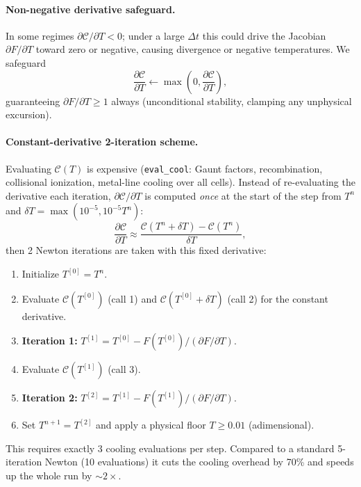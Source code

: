 \documentclass[english,a4paper]{my_memo}
\begin{document}
\paragraph{Non-negative derivative safeguard.} In some regimes
$\partial \mathcal{C}/\partial T < 0$; under a large $\Delta t$ this could drive the
Jacobian $\partial F/\partial T$ toward zero or negative, causing divergence or
negative temperatures. We safeguard
\begin{equation}
  \frac{\partial \mathcal{C}}{\partial T} \leftarrow \max\!\left(0, \frac{\partial \mathcal{C}}{\partial T}\right),
\end{equation}
guaranteeing $\partial F/\partial T \ge 1$ always (unconditional stability,
clamping any unphysical excursion).

\paragraph{Constant-derivative 2-iteration scheme.} Evaluating $\mathcal{C}(T)$ is
expensive (\texttt{eval\_cool}: Gaunt factors, recombination, collisional
ionization, metal-line cooling over all cells). Instead of re-evaluating the
derivative each iteration, $\partial \mathcal{C}/\partial T$ is computed \emph{once}
at the start of the step from $T^n$ and $\delta T = \max(10^{-5}, 10^{-5} T^n)$:
\begin{equation}
  \frac{\partial \mathcal{C}}{\partial T} \approx \frac{\mathcal{C}(T^n + \delta T) - \mathcal{C}(T^n)}{\delta T},
\end{equation}
then 2 Newton iterations are taken with this fixed derivative:
\begin{enumerate}
  \item Initialize $T^{[0]} = T^n$.
  \item Evaluate $\mathcal{C}(T^{[0]})$ (call 1) and $\mathcal{C}(T^{[0]}+\delta T)$
    (call 2) for the constant derivative.
  \item \textbf{Iteration 1:} $T^{[1]} = T^{[0]} - F(T^{[0]})/(\partial F/\partial T)$.
  \item Evaluate $\mathcal{C}(T^{[1]})$ (call 3).
  \item \textbf{Iteration 2:} $T^{[2]} = T^{[1]} - F(T^{[1]})/(\partial F/\partial T)$.
  \item Set $T^{n+1}=T^{[2]}$ and apply a physical floor $T \ge 0.01$ (adimensional).
\end{enumerate}
This requires exactly 3 cooling evaluations per step. Compared to a standard
5-iteration Newton (10 evaluations) it cuts the cooling overhead by 70\% and speeds
up the whole run by $\sim2\times$.
\end{document}
